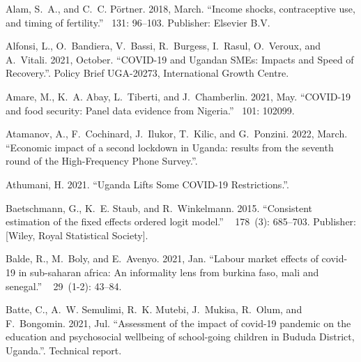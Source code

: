 \documentclass{wber}
\begin{document}
\begin{thebibliography}{}
Alam, S.~A., and C.~C. P{\"o}rtner. 2018, March.
\newblock ``Income shocks, contraceptive use, and timing of fertility.''
~{131}: 96--103.
\newblock Publisher: Elsevier B.V.

Alfonsi, L., O.~Bandiera, V.~Bassi, R.~Burgess, I.~Rasul, O.~Veroux, and
  A.~Vitali. 2021, October.
\newblock ``{COVID}-19 and {Ugandan} {SMEs}: {Impacts} and {Speed} of
  {Recovery}.''.
\newblock Policy Brief UGA-20273, International Growth Centre.

Amare, M., K.~A. Abay, L.~Tiberti, and J.~Chamberlin. 2021, May.
\newblock ``{COVID}-19 and food security: {Panel} data evidence from
  {Nigeria}.''
~{101}: 102099.

Atamanov, A., F.~Cochinard, J.~Ilukor, T.~Kilic, and G.~Ponzini. 2022, March.
\newblock ``Economic impact of a second lockdown in {Uganda}: results from the
  seventh round of the {High}-{Frequency} {Phone} {Survey}.''.

Athumani, H. 2021.
\newblock ``Uganda {Lifts} {Some} {COVID}-19 {Restrictions}.''.

Baetschmann, G., K.~E. Staub, and R.~Winkelmann. 2015.
\newblock ``Consistent estimation of the fixed effects ordered logit model.''
~{ 178\/}~(3): 685--703.
\newblock Publisher: [Wiley, Royal Statistical Society].

Balde, R., M.~Boly, and E.~Avenyo. 2021, Jan.
\newblock ``Labour market effects of covid-19 in sub-saharan africa: An
  informality lens from burkina faso, mali and senegal.''
~{ 29\/}~(1-2):
  43--84.

Batte, C., A.~W. Semulimi, R.~K. Mutebi, J.~Mukisa, R.~Olum, and F.~Bongomin.
  2021, Jul.
\newblock ``Assessment of the impact of covid-19 pandemic on the education and
  psychosocial wellbeing of school-going children in {Bududa} {District},
  {Uganda}.''.
\newblock Technical report.


\end{thebibliography}
\end{document}
